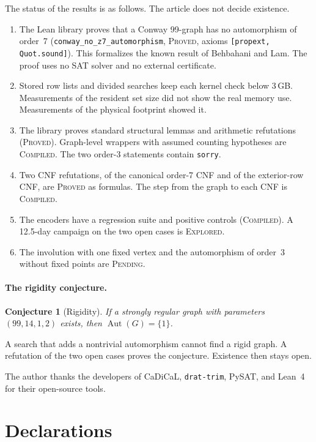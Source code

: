 \documentclass[pdflatex,sn-mathphys-num]{sn-jnl}
\theoremstyle{thmstyleone}
\newtheorem{conjecture}[theorem]{Conjecture}
\theoremstyle{thmstyletwo}
\theoremstyle{thmstylethree}
\DeclareMathOperator{\Aut}{Aut}
\numberwithin{equation}{section}
\begin{document}
The status of the results is as follows. The article does not decide existence.
\begin{enumerate}
 \item The Lean library proves that a Conway 99-graph has no automorphism of order~7 (\texttt{conway\_no\_z7\_automorphism}, \textsc{Proved}, axioms \texttt{[propext, Quot.sound]}). This formalizes the known result of Behbahani and Lam. The proof uses no SAT solver and no external certificate.
 \item Stored row lists and divided searches keep each kernel check below 3\,GB. Measurements of the resident set size did not show the real memory use. Measurements of the physical footprint showed it.
 \item The library proves standard structural lemmas and arithmetic refutations (\textsc{Proved}). Graph-level wrappers with assumed counting hypotheses are \textsc{Compiled}. The two order-3 statements contain \texttt{sorry}.
 \item Two CNF refutations, of the canonical order-7 CNF and of the exterior-row CNF, are \textsc{Proved} as formulas. The step from the graph to each CNF is \textsc{Compiled}.
 \item The encoders have a regression suite and positive controls (\textsc{Compiled}). A 12.5-day campaign on the two open cases is \textsc{Explored}.
 \item The involution with one fixed vertex and the automorphism of order~3 without fixed points are \textsc{Pending}.
\end{enumerate}

\paragraph{The rigidity conjecture.}
\begin{conjecture}[Rigidity]
If a strongly regular graph with parameters $(99, 14, 1, 2)$ exists, then $\Aut(G) = \{1\}$.
\end{conjecture}
A search that adds a nontrivial automorphism cannot find a rigid graph. A refutation of the two open cases proves the conjecture. Existence then stays open.

\backmatter

The author thanks the developers of CaDiCaL, \texttt{drat-trim}, PySAT, and Lean~4 for their open-source tools.

\section*{Declarations}
\end{document}
